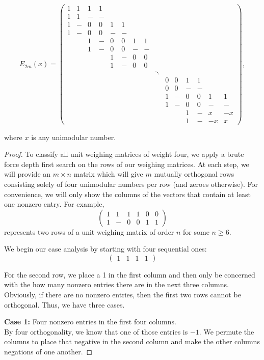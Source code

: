 \begin{lemma}
$$E_{2m}(x) = \left(\begin{array}{rrrrrrrrrrrrrrr} 
1&1&1&1\\1&1&-&-\\1&-&0&0&1&1\\1&-&0&0&-&-\\~&~&1&-&0&0&1&1\\~&~&1&-&0&0&-&-\\~&~&~&~&1&-&0&0\\~&~&~&~&1&-&0&0 \\ ~&~&~&~&~&~&~&~&\ddots \\~&~&~&~&~&~&~&~&~&0&0&1&1 \\ ~&~&~&~&~&~&~&~&~&0&0&-&- \\ ~&~&~&~&~&~&~&~&~&1&-&0&0&1&1 \\ ~&~&~&~&~&~&~&~&~&1&-&0&0&-&- \\~&~&~&~&~&~&~&~&~&~&~&1&-&x&-x \\ ~&~&~&~&~&~&~&~&~&~&~&1&-&-x&x \end{array}\right),$$

where $x$ is any unimodular number.

\begin{proof}
 To classify all unit weighing matrices of weight four, we apply a brute force depth first search on the rows of our weighing matrices. At each step, we will provide an $m \times n$ matrix which will give $m$ mutually orthogonal rows consisting solely of four unimodular numbers per row (and zeroes otherwise). For convenience, we will only show the columns of the vectors that contain at least one nonzero entry. For example,
   $$\left(\begin{array}{cccccc}
     1 & 1 & 1 & 1 & 0 & 0 \\
     1 & - & 0 & 0 & 1 & 1
    \end{array}\right)$$
  represents two rows of a unit weighing matrix of order $n$ for some $n \geq 6$.

 We begin our case analysis by starting with four sequential ones:
 $$\left(\begin{array}{cccc}
     1 & 1 & 1 & 1
    \end{array}\right)$$

 For the second row, we place a 1 in the first column and then only be concerned with the how many nonzero entries there are in the next three columns. Obviously, if there are no nonzero entries, then the first two rows cannot be orthogonal. Thus, we have three cases.

 {\bf Case 1:} Four nonzero entries in the first four columns. \\
  By four orthogonality, we know that one of those entries is $-1$. We permute the columns to place that negative in the second column and make the other columns negations of one another.


\end{proof}
\end{lemma}
